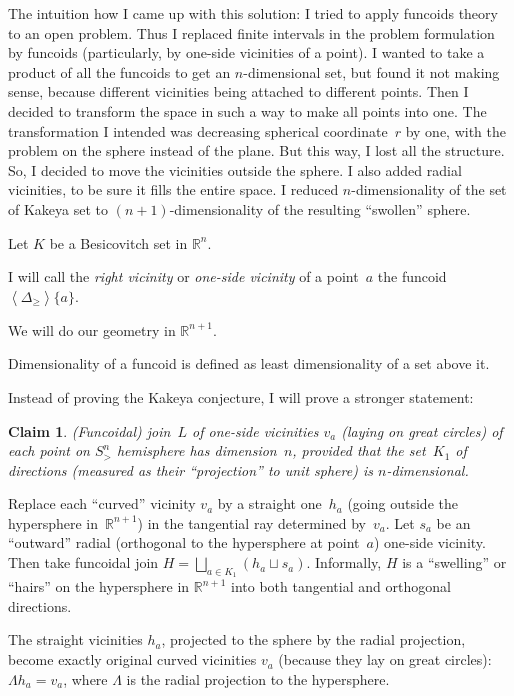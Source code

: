 \documentclass[oneside,draft]{amsart}
\newcommand{\supfun}[1]{\left\langle#1\right\rangle}
\newtheorem{claim}{Claim}
\begin{document}
The intuition how I came up with this solution: I tried to apply funcoids theory to an open problem. Thus I replaced finite intervals in the problem formulation by funcoids (particularly, by one-si\-de vicinities of a point). I wanted to take a product of all the funcoids to get an $n$-di\-men\-si\-on\-al set, but found it not making sense, because different vicinities being attached to different points. Then I decided to transform the space in such a way to make all points into one. The transformation I intended was decreasing spherical coordinate~$r$ by one, with the problem on the sphere instead of the plane. But this way, I lost all the structure. So, I decided to move the vicinities outside the sphere. I also added radial vicinities, to be sure it fills the entire space. I reduced $n$-di\-men\-sio\-na\-li\-ty of the set of Kakeya set to $(n+1)$-di\-men\-sio\-na\-li\-ty of the resulting ``swollen'' sphere.

Let $K$ be a Besicovitch set in $\mathbb{R}^n$.

I will call the \emph{right vicinity} or \emph{one-si\-de vicinity} of a point~$a$ the funcoid~$\supfun{\Delta_{\geq}}\{a\}$.

We will do our geometry in $\mathbb{R}^{n+1}$.

Dimensionality of a funcoid is defined as least dimensionality of a set above it.

Instead of proving the Kakeya conjecture, I will prove a stronger statement:

\begin{claim}
(Funcoidal) join~$L$ of one-si\-de vicinities $v_a$ (laying on great circles) of each point on $S^n_{>}$ hemisphere has dimension~$n$, provided that the set~$K_1$ of directions (measured as their ``projection'' to unit sphere) is $n$-di\-men\-sio\-nal.
\end{claim}

Replace each ``curved'' vicinity $v_a$ by a straight one~$h_a$ (going outside the hypersphere in~$\mathbb{R}^{n+1}$) in the tangential ray determined by~$v_a$. Let $s_a$ be an ``outward'' radial (orthogonal to the hypersphere at point~$a$) one-si\-de vicinity. Then take funcoidal join $H=\bigsqcup_{a\in K_1}(h_a\sqcup s_a)$. Informally, $H$ is a ``swelling'' or ``hairs'' on the hypersphere in $\mathbb{R}^{n+1}$ into both tangential and orthogonal directions.

The straight vicinities $h_a$, projected to the sphere by the radial projection, become exactly original curved vicinities $v_a$ (because they lay on great circles): $\Lambda h_a=v_a$, where $\Lambda$ is the radial projection to the hypersphere.
\end{document}
